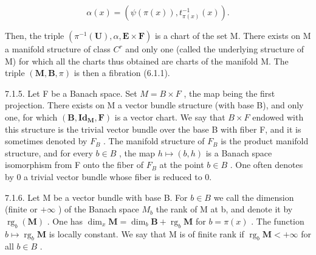 \[
\alpha (x) = (\psi (\pi (x)), t _ {\pi (x)} ^ {- 1} (x)).
\]

Then, the triple \((\pi^{-1}(\mathbf{U}), \alpha, \mathbf{E} \times \mathbf{F})\) is a chart of the set M. There exists on M a manifold structure of class \(C^{r}\) and only one (called the underlying structure of M) for which all the charts thus obtained are charts of the manifold M. The triple \((\mathbf{M}, \mathbf{B}, \pi)\) is then a fibration (6.1.1).

7.1.5. Let F be a Banach space. Set \(M = B \times F\) , the map being the first projection. There exists on M a vector bundle structure (with base B), and only one, for which \((\mathbf{B}, \mathbf{Id}_{\mathbf{M}}, \mathbf{F})\) is a vector chart. We say that \(B \times F\) endowed with this structure is the trivial vector bundle over the base B with fiber F, and it is sometimes denoted by \(F_{B}\) . The manifold structure of \(F_{B}\) is the product manifold structure, and for every \(b \in B\) , the map \(h \mapsto (b, h)\) is a Banach space isomorphism from F onto the fiber of \(F_{B}\) at the point \(b \in B\) . One often denotes by 0 a trivial vector bundle whose fiber is reduced to 0.

7.1.6. Let M be a vector bundle with base B. For \(b \in B\) we call the dimension (finite or \(+\infty\) ) of the Banach space \(M_{b}\) the rank of M at b, and denote it by \(\operatorname{rg}_{b}(\mathbf{M})\) . One has \(\dim_{x}\mathbf{M} = \dim_{b}\mathbf{B} + \operatorname{rg}_{b}\mathbf{M}\) for \(b = \pi(x)\) . The function \(b \mapsto \operatorname{rg}_{b}\mathbf{M}\) is locally constant. We say that M is of finite rank if \(\operatorname{rg}_{b}\mathbf{M} < +\infty\) for all \(b \in B\) .

